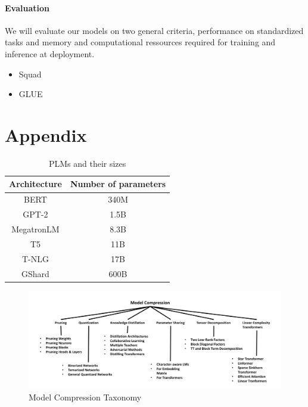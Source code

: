 \documentclass{article}
\begin{document}
\paragraph{Evaluation} We will evaluate our models on two general criteria,
performance on standardized tasks and memory and computational ressources required
for training and inference at deployment.
\begin{itemize}
  \item Squad\cite{squad}
  \item GLUE\cite{glue}
\end{itemize}


\clearpage



\clearpage
\appendix
\section{Appendix}

\begin{table}[htbp]
\centering
  \begin{tabular}{cc}
    \toprule
    Architecture & Number of parameters\\
    \midrule
    BERT & 340M\\
    GPT-2 & 1.5B\\
    MegatronLM & 8.3B\\
    T5 & 11B\\
    T-NLG & 17B\\
    GShard & 600B\\
    \bottomrule
  \end{tabular}
  \caption{PLMs and their sizes\cite{gupta2020compression}}\label{plmsize}
\end{table}

\begin{figure}[h]
  \centering
  \includegraphics[width=\textwidth]{illustrations/modelcompressiontaxonomy}
  \caption{Model Compression Taxonomy\cite{gupta2020compression}}\label{fig:modelcompression}
\end{figure}
\end{document}
